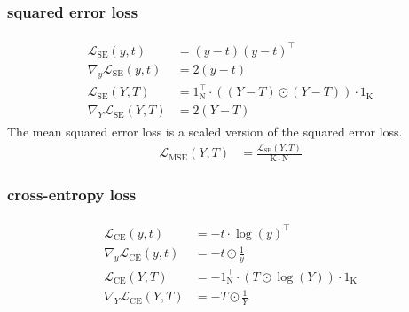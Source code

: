 \documentclass{article}
\newcommand{\const}[1]{\ensuremath{\mathrm{#1}}} %
\begin{document}
\subsubsection*{squared error loss}
\begin{align}
\begin{split}
  \mathcal{L}_\text{SE}(y, t) &= (y - t) (y - t)^\top
  \\
  \nabla_y \mathcal{L}_\text{SE}(y, t) &= 2(y - t)
  \\
  \mathcal{L}_\text{SE}(Y, T) &= 1_\const{N}^\top \cdot ((Y - T) \odot (Y - T)) \cdot 1_\const{K}
  \\
  \nabla_Y \mathcal{L}_\text{SE}(Y, T) &= 2(Y - T)
\end{split}  
\end{align}
The mean squared error loss is a scaled version of the squared error loss.
\begin{align*}
  \mathcal{L}_\text{MSE}(Y, T) &= \frac{\mathcal{L}_\text{SE}(Y, T)} {\const{K} \cdot \const{N}}
\end{align*}

\subsubsection*{cross-entropy loss}
\begin{align}
\begin{split}
  \mathcal{L}_\text{CE}(y, t) &= - t \cdot \log(y)^\top
  \\
  \nabla_y \mathcal{L}_\text{CE}(y, t) &= - t \odot \frac{1}{y}
  \\
  \mathcal{L}_\text{CE}(Y, T) &= - 1_\const{N}^\top \cdot (T \odot \log(Y)) \cdot 1_\const{K}
  \\
  \nabla_Y \mathcal{L}_\text{CE}(Y, T) &= -T \odot \frac{1}{Y}
\end{split} 
\end{align}
\end{document}
